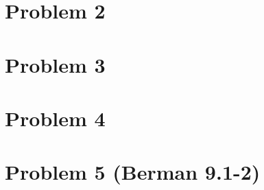 \documentclass[12pt]{article}
\begin{document}
\section*{Problem 2}



\section*{Problem 3}



\section*{Problem 4}



\section*{Problem 5 (Berman 9.1-2)}


\end{document}

